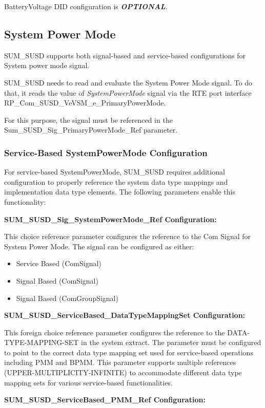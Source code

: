 {BatteryVoltage DID configuration is \textit{\textbf{OPTIONAL}}.

\subsection{System Power Mode}
\label{sec:pmm}
SUM\_SUSD supports both signal-based and service-based configurations for System power mode signal.

SUM\_SUSD needs to read and evaluate the System Power Mode signal.
To do that, it reads the value of \textit{SystemPowerMode} signal via the RTE port interface RP\_Com\_SUSD\_VeVSM\_e\_PrimaryPowerMode.

For this purpose, the signal must be referenced in the Sum\_SUSD\_Sig\_PrimaryPowerMode\_Ref parameter.

\subsubsection{Service-Based SystemPowerMode Configuration}
\label{sec:servicebasedpmm}
For service-based SystemPowerMode, SUM\_SUSD requires additional configuration to  properly reference the system data type mappings and implementation data type elements. The following parameters enable this functionality:

\textbf{SUM\_SUSD\_Sig\_SystemPowerMode\_Ref Configuration:}

This choice reference parameter configures the reference to the Com Signal for System Power Mode. The signal can be configured as either:
\begin{itemize}
  \item Service Based (ComSignal)
	\item Signal Based (ComSignal)
	\item Signal Based (ComGroupSignal)
\end{itemize}

\textbf{SUM\_SUSD\_ServiceBased\_DataTypeMappingSet Configuration:}

This foreign choice reference parameter configures the reference to the DATA-TYPE-MAPPING-SET in the system extract. The parameter must be configured to point to the correct data type mapping set used for service-based operations including PMM and BPMM. This parameter supports multiple references (UPPER-MULTIPLICITY-INFINITE) to accommodate different data type mapping sets for various service-based functionalities.

\textbf{SUM\_SUSD\_ServiceBased\_PMM\_Ref Configuration:}

}
